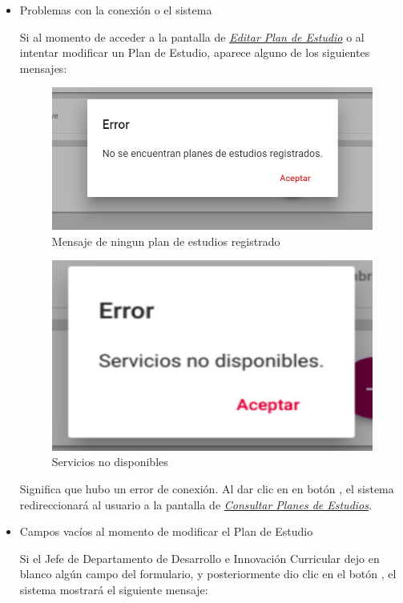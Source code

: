 \begin{itemize}
	\item Problemas con la conexión o el sistema

	Si al momento de acceder a la pantalla de \hyperlink{editarPE}{\textit{Editar Plan de Estudio}} o al intentar modificar un Plan de Estudio, aparece alguno de los siguientes mensajes:

	\begin{figure}[!hbtp]
		\centering
		\hypertarget{ms3}{\includegraphics[width=0.7\linewidth]{images/SP4-GPE/m3}}
		\caption{Mensaje de ningun plan de estudios registrado}
		\label{ms3}
	\end{figure}
	\begin{figure}[!hbtp]
		\centering
		\hypertarget{error}{\includegraphics[width=0.7\linewidth]{images/SP4-GPE/error}}
		\caption{Servicios no disponibles}
		\label{error}
	\end{figure}


	Significa que hubo un error de conexión. Al dar clic en en botón  , el sistema redireccionará al usuario a la pantalla de \hyperlink{consultarPE}{\textit{Consultar Planes de Estudios}}. 
	\newpage

	\item Campos vacíos al momento de modificar el Plan de Estudio

	Si el Jefe de Departamento de Desarrollo e Innovación Curricular dejo en blanco algún campo del formulario, y posteriormente dio clic en el botón  , el sistema mostrará el siguiente mensaje:


\end{itemize}
